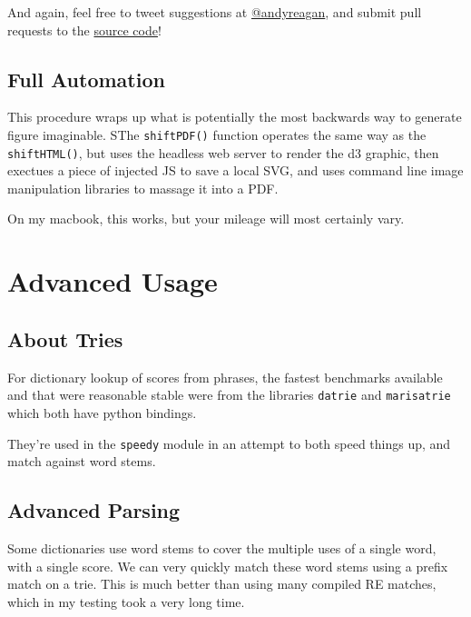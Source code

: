 And again, feel free to tweet suggestions at \href{https://twitter.com/andyreagan}{@andyreagan}, and submit pull requests to the \href{https://github.com/andyreagan/labMT-simple}{source code}!

\subsection{Full Automation}
\label{wordshifts:full-automation}
This procedure wraps up what is potentially the most backwards way to generate figure imaginable.
SThe \lstinline{shiftPDF()} function operates the same way as the \lstinline{shiftHTML()}, but uses the headless web server to render the d3 graphic, then exectues a piece of injected JS to save a local SVG, and uses command line image manipulation libraries to massage it into a PDF.

On my macbook, this works, but your mileage will most certainly vary.


\section{Advanced Usage}
\label{advanced::doc}\label{advanced:advanced-usage}

\subsection{About Tries}
\label{advanced:about-tries}
For dictionary lookup of scores from phrases, the fastest benchmarks available and that were reasonable stable were from the libraries \lstinline{datrie} and \lstinline{marisatrie} which both have python bindings.

They're used in the \lstinline{speedy} module in an attempt to both speed things up, and match against word stems.

\subsection{Advanced Parsing}
\label{advanced:advanced-parsing}
Some dictionaries use word stems to cover the multiple uses of a single word, with a single score.
We can very quickly match these word stems using a prefix match on a trie.
This is much better than using many compiled RE matches, which in my testing took a very long time.


